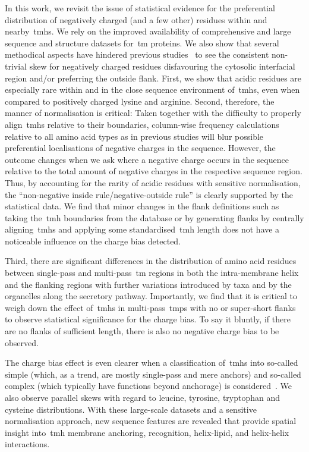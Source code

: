 In this work, we revisit the issue of statistical evidence for the preferential distribution of negatively charged (and a few other) residues within and nearby~\gls{tmh}s.
We rely on the improved availability of comprehensive and large sequence and structure datasets for~\gls{tm} proteins.
We also show that several methodical aspects have hindered previous studies~\cite{Sharpe2010, Baeza-Delgado2013, Pogozheva2013} to see the consistent non-trivial skew for negatively charged residues disfavouring the cytosolic interfacial region and/or preferring the outside flank.
First, we show that acidic residues are especially rare within and in the close sequence environment of~\gls{tmh}s, even when compared to positively charged lysine and arginine.
Second, therefore, the manner of normalisation is critical: Taken together with the difficulty to properly align~\gls{tmh}s relative to their boundaries, column-wise frequency calculations relative to all amino acid types as in previous studies will blur possible preferential localisations of negative charges in the sequence.
However, the outcome changes when we ask where a negative charge occurs in the sequence relative to the total amount of negative charges in the respective sequence region.
Thus, by accounting for the rarity of acidic residues with sensitive normalisation, the ``non-negative inside rule/negative-outside rule'' is clearly supported by the statistical data.
We find that minor changes in the flank definitions such as taking the~\gls{tmh} boundaries from the database or by generating flanks by centrally aligning~\gls{tmh}s and applying some standardised~\gls{tmh} length does not have a noticeable influence on the charge bias detected.

Third, there are significant differences in the distribution of amino acid residues between single-pass and multi-pass~\gls{tm} regions in both the intra-membrane helix and the flanking regions with further variations introduced by taxa and by the organelles along the secretory pathway.
Importantly, we find that it is critical to weigh down the effect of~\gls{tmh}s in multi-pass~\gls{tmp}s with no or super-short flanks to observe statistical significance for the charge bias.
To say it bluntly, if there are no flanks of sufficient length, there is also no negative charge bias to be observed.

The charge bias effect is even clearer when a classification of~\gls{tmh}s into so-called simple (which, as a trend, are mostly single-pass and mere anchors) and so-called complex (which typically have functions beyond anchorage) is considered~\cite{Wong2010, Wong2011, Wong2012}.
We also observe parallel skews with regard to leucine, tyrosine, tryptophan and cysteine distributions.
With these large-scale datasets and a sensitive normalisation approach, new sequence features are revealed that provide spatial insight into~\gls{tmh} membrane anchoring, recognition, helix-lipid, and helix-helix interactions.

